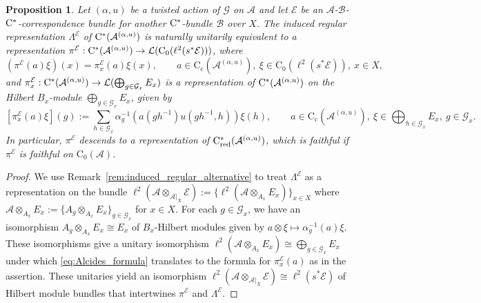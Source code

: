 \documentclass[11 pt, leqno]{amsart}
\numberwithin{equation}{section}
\theoremstyle{plain}
\newtheorem {prop}[thm] {Proposition}
\theoremstyle{definition}
\newcommand*{\contc}{\mathrm{C_c}}%
\newcommand*{\contz}{\mathrm{C_0}}%
\DeclareMathOperator{\red}{red}%
\newcommand{\B}{\mathcal B}
\newcommand{\LL}{\mathcal L}
\newcommand{\G}{\mathcal G} %
\newcommand{\EE}{\mathcal E}
\newcommand{\A}{\mathcal A}
\newcommand{\cst}{\ifmmode\mathrm{C}^*\else{$\mathrm{C}^*$}\fi}
\begin{document}
\begin{prop}\label{prop:induced_regular_representations_for_actions}
Let $(\alpha, u)$ be a twisted action of $\G$ on $\A$ and let $\EE$ be an $\A$-$\B$-$\cst$-correspondence bundle for another $\cst$-bundle $\B$ over $X$. 
The induced regular representation $\Lambda^{\EE}$ of $\cst(\A^{(\alpha,u)})$ is naturally unitarily equivalent to a representation $\pi^{\EE}:\cst(\A^{(\alpha,u)})\to \LL(\contz(\ell^2(s^*\EE)))$, where
\[
    (\pi^\EE(a)\xi)(x)= \pi_{x}^{\EE}(a)\xi(x), \qquad a\in \contc(\A^{(\alpha,u)}) ,\ \xi\in \contz(\ell^2(s^*\EE)) ,\ x \in X ,
\]
and $\pi_{x}^{\EE} : \cst(\A^{(\alpha,u)})\to \LL(\bigoplus_{g \in \G_x} E_x)$ is a representation of $\cst(\A^{(\alpha,u)})$ on the  Hilbert $B_{x}$-module $\bigoplus_{g \in \G_x} E_x$, given by
\[
    [\pi_{x}^{\EE}(a) \xi](g) := \sum_{h \in \G_x} \alpha_{g}^{-1} \left( a(g h^{-1})u(gh^{-1},h) \right) \xi(h) , \qquad a\in \contc(\A^{(\alpha,u)}),\ \xi \in \bigoplus_{h \in \G_x} E_x ,\ g \in \G_x.
\]
In particular, $\pi^{\EE}$ descends to a representation of $\cst_{\red}(\A^{(\alpha,u)})$, which is faithful if $\pi^{\EE}$ is faithful on $\contz(\A)$.
\end{prop}
\begin{proof}
We use Remark~\ref{rem:induced_regular_alternative} to treat $\Lambda^{\EE}$ as a   representation on the bundle $\ell^2(\A\otimes_{\A|_X} \EE) := \{ \ell^2( \A\otimes_{A_x} E_x)\}_{x\in X}$ where $\A\otimes_{A_x} E_x:=\{A_g\otimes_{A_x}E_x\}_ {g\in \G_x}$ for $x\in X$. For each $g\in \G_x$, we have an isomorphism $A_g\otimes_{A_x}E_x\cong E_x$ of $B_x$-Hilbert modules given by $a\otimes \xi \mapsto \alpha_g^{-1}(a)\xi$.
These isomorphisms give a unitary isomorphism $\ell^2(\A\otimes_{A_x} E_x)\cong \bigoplus_{g \in \G_x} E_x$ under which \eqref{eq:Alcides_formula} translates to the formula for $\pi_{x}^{\EE}(a)$ as in the assertion.  
These unitaries yield an isomorphism $\ell^2(\A\otimes_{\A|_X} \EE)\cong \ell^2(s^*\EE)$ of Hilbert module bundles that intertwines $\pi^\EE$ and $\Lambda^{\EE}$.
\end{proof}
\end{document}
